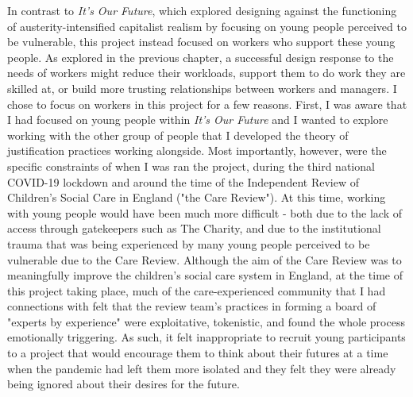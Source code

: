 In contrast to \textit{It's Our Future}, which explored designing against the functioning of austerity-intensified capitalist realism by focusing on young people perceived to be vulnerable, this project instead focused on workers who support these young people. As explored in the previous chapter, a successful design response to the needs of workers might reduce their workloads, support them to do work they are skilled at, or build more trusting relationships between workers and managers. I chose to focus on workers in this project for a few reasons. First, I was aware that I had focused on young people within \textit{It's Our Future} and I wanted to explore working with the other group of people that I developed the theory of justification practices working alongside. Most importantly, however, were the specific constraints of when I was ran the project, during the third national COVID-19 lockdown and around the time of the Independent Review of Children's Social Care in England ("the Care Review"). At this time, working with young people would have been much more difficult - both due to the lack of access through gatekeepers such as The Charity, and due to the institutional trauma that was being experienced by many young people perceived to be vulnerable due to the Care Review. Although the aim of the Care Review was to meaningfully improve the children's social care system in England, at the time of this project taking place, much of the care-experienced community that I had connections with felt that the review team's practices in forming a board of "experts by experience" were exploitative, tokenistic, and found the whole process emotionally triggering. As such, it felt inappropriate to recruit young participants to a project that would encourage them to think about their futures at a time when the pandemic had left them more isolated and they felt they were already being ignored about their desires for the future. 

